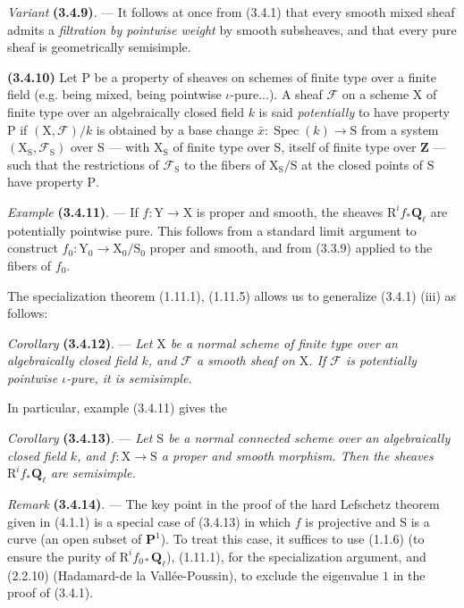 \documentclass[11pt,leqno]{article}
\begin{document}
\textit{Variant} \textbf{(3.4.9)}. — It follows at once from (3.4.1) that every smooth mixed sheaf admits a \textit{filtration by pointwise weight} by smooth subsheaves, and that every pure sheaf is geometrically semisimple.

\textbf{(3.4.10)} Let \(\mathrm P\) be a property of sheaves on schemes of finite type over a finite field (e.g. being mixed, being pointwise \(\iota\)-pure...). A sheaf \(\mathscr F\) on a scheme \(\mathrm X\) of finite type over an algebraically closed field \(k\) is said \textit{potentially} to have property \(\mathrm P\) if \((\mathrm X,\mathscr F)/k\) is obtained by a base change \(\bar x:\operatorname{Spec}(k)\to\mathrm S\) from a system \((\mathrm X_{\mathrm S},\mathscr F_{\mathrm S})\) over \(\mathrm S\) — with \(\mathrm X_{\mathrm S}\) of finite type over \(\mathrm S\), itself of finite type over \(\mathbf Z\) — such that the restrictions of \(\mathscr F_{\mathrm S}\) to the fibers of \(\mathrm X_{\mathrm S}/\mathrm S\) at the closed points of \(\mathrm S\) have property \(\mathrm P\).

\textit{Example} \textbf{(3.4.11)}. — If \(f:\mathrm Y\to\mathrm X\) is proper and smooth, the sheaves \(\mathrm R^if_*\mathbf Q_\ell\) are potentially pointwise pure. This follows from a standard limit argument to construct \(f_0:\mathrm Y_0\to\mathrm X_0/\mathrm S_0\) proper and smooth, and from (3.3.9) applied to the fibers of \(f_0\).

The specialization theorem (1.11.1), (1.11.5) allows us to generalize (3.4.1) (iii) as follows:

\textit{Corollary} \textbf{(3.4.12)}. — \textit{Let \(\mathrm X\) be a normal scheme of finite type over an algebraically closed field \(k\), and \(\mathscr F\) a smooth sheaf on \(\mathrm X\). If \(\mathscr F\) is potentially pointwise \(\iota\)-pure, it is semisimple.}

In particular, example (3.4.11) gives the

\textit{Corollary} \textbf{(3.4.13)}. — \textit{Let \(\mathrm S\) be a normal connected scheme over an algebraically closed field \(k\), and \(f:\mathrm X\to\mathrm S\) a proper and smooth morphism. Then the sheaves \(\mathrm R^if_*\mathbf Q_\ell\) are semisimple.}

\textit{Remark} \textbf{(3.4.14)}. — The key point in the proof of the hard Lefschetz theorem given in (4.1.1) is a special case of (3.4.13) in which \(f\) is projective and \(\mathrm S\) is a curve (an open subset of \(\mathbf P^1\)). To treat this case, it suffices to use (1.1.6) (to ensure the purity of \(\mathrm R^if_{0*}\mathbf Q_\ell\)), (1.11.1), for the specialization argument, and (2.2.10) (Hadamard-de la Vallée-Poussin), to exclude the eigenvalue \(1\) in the proof of (3.4.1).
\end{document}
